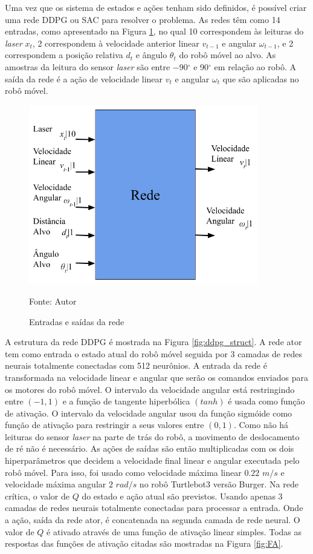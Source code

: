 Uma vez que os sistema de estados e ações tenham sido definidos, é possível criar uma rede DDPG ou SAC para resolver o problema.
As redes têm como 14 entradas, como apresentado na Figura \ref{fig:in_out}, no qual 10 correspondem às leituras do \textit{laser} $x_t$, 2 correspondem à velocidade anterior linear $v_{t-1}$ e angular $\omega_{t-1}$, e 2 correspondem a posição relativa $d_t$ e ângulo $\theta_t$ do robô móvel ao alvo.
As amostras da leitura do sensor \textit{laser} são entre $-$90$^\circ$ e 90$^\circ$ em relação ao robô. A saída da rede é a ação de velocidade linear $v_t$ e angular $\omega_t$ que são aplicadas no robô móvel.

\begin{figure}[H]
\caption{Entradas e saídas da rede}
\centerline{\includegraphics[width=10cm]{imagens/input_and_output.png}}
\small{Fonte: Autor}
\label{fig:in_out}
\end{figure}

A estrutura da rede DDPG é mostrada na Figura \ref{fig:ddpg_struct}. A rede ator tem como entrada o estado atual do robô móvel seguida por 3 camadas de redes neurais totalmente conectadas com 512 neurônios. A entrada da rede é transformada na velocidade linear e angular que serão os comandos enviados para os motores do robô móvel.
O intervalo da velocidade angular está restringindo entre $(-1,1)$ e a função de tangente hiperbólica $(tanh)$ é usada como função de ativação.
O intervalo da velocidade angular usou da função sigmóide como função de ativação para restringir a seus valores entre $(0,1)$.
Como não há leituras do sensor \textit{laser} na parte de trás do robô, a movimento de deslocamento de ré não é necessário.
As ações de saídas são então multiplicadas com os dois
hiperparâmetros que decidem a velocidade final linear e angular executada pelo robô móvel.
Para isso, foi usado como velocidade máxima linear $0.22$ $m/s$ e velocidade máxima angular $2$ $rad/s$ no robô Turtlebot3 versão Burger.
Na rede crítica, o valor de $Q$ do estado e ação atual são previstos.
Usando apenas 3 camadas de redes neurais totalmente conectadas para processar a entrada. Onde a ação, saída da rede ator, é concatenada na segunda camada de rede neural.
O valor de $Q$ é ativado através de uma função de ativação linear simples. Todas as respostas das funções de ativação citadas são mostradas na Figura \ref{fig:FA}.

